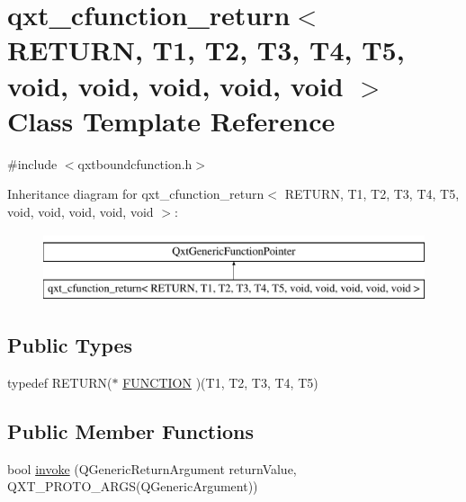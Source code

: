 \hypertarget{classqxt__cfunction__return_3_01_r_e_t_u_r_n_00_01_t1_00_01_t2_00_01_t3_00_01_t4_00_01_t5_00_01va717bb511aabe427a3a25b2e1c17ca03}{\section{qxt\-\_\-cfunction\-\_\-return$<$ R\-E\-T\-U\-R\-N, T1, T2, T3, T4, T5, void, void, void, void, void $>$ Class Template Reference}
\label{classqxt__cfunction__return_3_01_r_e_t_u_r_n_00_01_t1_00_01_t2_00_01_t3_00_01_t4_00_01_t5_00_01va717bb511aabe427a3a25b2e1c17ca03}
}


{\ttfamily \#include $<$qxtboundcfunction.\-h$>$}

Inheritance diagram for qxt\-\_\-cfunction\-\_\-return$<$ R\-E\-T\-U\-R\-N, T1, T2, T3, T4, T5, void, void, void, void, void $>$\-:\begin{figure}[H]
\begin{center}
\leavevmode
\includegraphics[height=2.000000cm]{classqxt__cfunction__return_3_01_r_e_t_u_r_n_00_01_t1_00_01_t2_00_01_t3_00_01_t4_00_01_t5_00_01va717bb511aabe427a3a25b2e1c17ca03}
\end{center}
\end{figure}
\subsection*{Public Types}
\begin{DoxyCompactItemize}
\item 
typedef R\-E\-T\-U\-R\-N($\ast$ \hyperlink{classqxt__cfunction__return_3_01_r_e_t_u_r_n_00_01_t1_00_01_t2_00_01_t3_00_01_t4_00_01_t5_00_01va717bb511aabe427a3a25b2e1c17ca03_a14e13777b50b65b2d5a9c5be7be2d0ed}{F\-U\-N\-C\-T\-I\-O\-N} )(T1, T2, T3, T4, T5)
\end{DoxyCompactItemize}
\subsection*{Public Member Functions}
\begin{DoxyCompactItemize}
\item 
bool \hyperlink{classqxt__cfunction__return_3_01_r_e_t_u_r_n_00_01_t1_00_01_t2_00_01_t3_00_01_t4_00_01_t5_00_01va717bb511aabe427a3a25b2e1c17ca03_a690a8afd5b6537805af4281bbce22251}{invoke} (Q\-Generic\-Return\-Argument return\-Value, Q\-X\-T\-\_\-\-P\-R\-O\-T\-O\-\_\-A\-R\-G\-S(Q\-Generic\-Argument))
\end{DoxyCompactItemize}
